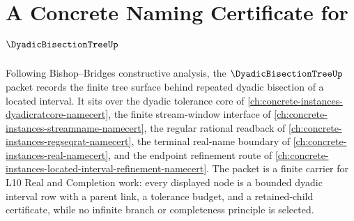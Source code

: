 \chapter{A Concrete Naming Certificate for $\DyadicBisectionTreeUp$}
\label{ch:concrete-instances-dyadic-bisection-tree-namecert}

Following Bishop--Bridges constructive analysis, the $\DyadicBisectionTreeUp$ packet records the finite tree surface behind repeated dyadic bisection of a located interval. It sits over the dyadic tolerance core of \autoref{ch:concrete-instances-dyadicratcore-namecert}, the finite stream-window interface of \autoref{ch:concrete-instances-streamname-namecert}, the regular rational readback of \autoref{ch:concrete-instances-regseqrat-namecert}, the terminal real-name boundary of \autoref{ch:concrete-instances-real-namecert}, and the endpoint refinement route of \autoref{ch:concrete-instances-located-interval-refinement-namecert}. The packet is a finite carrier for L10 Real and Completion work: every displayed node is a bounded dyadic interval row with a parent link, a tolerance budget, and a retained-child certificate, while no infinite branch or completeness principle is selected.

